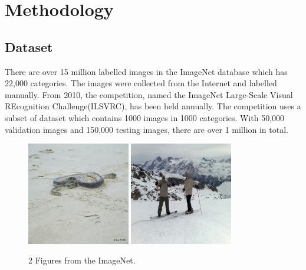
\chapter{Methodology} %
\label{Chapter3}

\section{Dataset}

There are over 15 million labelled images in the ImageNet database which has 22,000 categories. The images were collected from the Internet and labelled manually. From 2010, the competition, named the ImageNet Large-Scale Visual REcognition Challenge(ILSVRC)\citep{deng2009imagenet}, has been held annually. The competition uses a subset of dataset which contains 1000 images in 1000 categories. With 50,000 validation images and 150,000 testing images, there are over 1 million in total.
\graphicspath{ {./Figures/} }
\begin{figure}[!htb]
    \centering
	\includegraphics[width=0.4\textwidth]{ILSVRC2012_val_00000001.JPEG}
    \qquad
    \includegraphics[width=0.4\textwidth]{ILSVRC2012_val_00000002.JPEG}
    \caption{2 Figures from the ImageNet\citep{deng2009imagenet}.}%
    \label{fig:ImageNetExamples}%
\end{figure}

